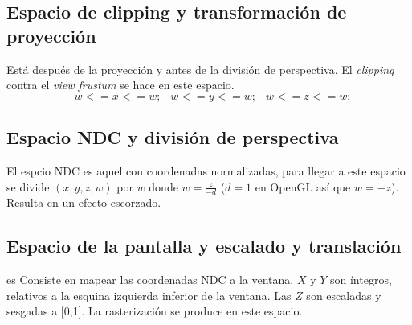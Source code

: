 \subsection{Espacio de clipping y transformación de proyección}
Está después de la proyección y antes de la división de perspectiva. El \textit{clipping} contra el \textit{view frustum} se hace en este espacio.
\begin{equation*}
  -w <= x <= w;
  -w <= y <= w;
  -w <= z <= w;
  \end{equation*}
\subsection{Espacio NDC y división de perspectiva}
El espcio NDC es aquel con coordenadas normalizadas, para llegar a este espacio se divide $(x,y,z,w)$ por $w$ donde $w = \frac{z}{-d}$ ($d=1$ en OpenGL así que $w= -z$).
Resulta en un efecto escorzado.
\subsection{Espacio de la pantalla y escalado y translación}es
Consiste en mapear las coordenadas NDC a la ventana. $X$ y $Y$ son íntegros, relativos a la esquina izquierda inferior de la ventana. Las $Z$ son escaladas y sesgadas a [0,1]. La rasterización se produce en este espacio.
